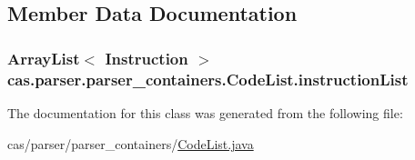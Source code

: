 \subsection{Member Data Documentation}
\hypertarget{classcas_1_1parser_1_1parser__containers_1_1_code_list_a4a93e4fcdc23551521463643f0ecb1a3}{
\subsubsection[{instruction\-List}]{\setlength{\rightskip}{0pt plus 5cm}Array\-List$<$ {\bf Instruction} $>$ cas.\-parser.\-parser\-\_\-containers.\-Code\-List.\-instruction\-List\hspace{0.3cm}{\ttfamily [protected]}}}\label{classcas_1_1parser_1_1parser__containers_1_1_code_list_a4a93e4fcdc23551521463643f0ecb1a3}


The documentation for this class was generated from the following file\-:\begin{DoxyCompactItemize}
\item 
cas/parser/parser\-\_\-containers/\hyperlink{_code_list_8java}{Code\-List.\-java}\end{DoxyCompactItemize}
